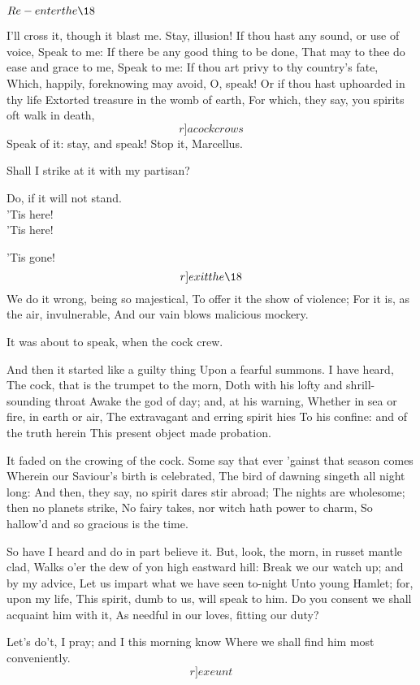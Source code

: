 \documentclass[11pt]{book}
\begin{document}
	\(Re-enter the \18\)

	I'll cross it, though it blast me. Stay, illusion!
	If thou hast any sound, or use of voice,
	Speak to me:
	If there be any good thing to be done,
	That may to thee do ease and grace to me,
	Speak to me:
	If thou art privy to thy country's fate,
	Which, happily, foreknowing may avoid,
   O, speak!
	Or if thou hast uphoarded in thy life
	Extorted treasure in the womb of earth,
	For which, they say, you spirits oft walk in death,
	\[r]a cock crows\]
	Speak of it: stay, and speak! Stop it, Marcellus.

	Shall I strike at it with my partisan?

\6	Do, if it will not stand. \\

	'Tis here! \\

\6	'Tis here!

	'Tis gone! 	\[r]exit the \18\]
	We do it wrong, being so majestical,
	To offer it the show of violence;
	For it is, as the air, invulnerable,
	And our vain blows malicious mockery.

	It was about to speak, when the cock crew.

\6	And then it started like a guilty thing
	Upon a fearful summons. I have heard,
	The cock, that is the trumpet to the morn,
	Doth with his lofty and shrill-sounding throat
	Awake the god of day; and, at his warning,
	Whether in sea or fire, in earth or air,
	The extravagant and erring spirit hies
	To his confine: and of the truth herein
	This present object made probation.

	It faded on the crowing of the cock.
	Some say that ever 'gainst that season comes
	Wherein our Saviour's birth is celebrated,
	The bird of dawning singeth all night long:
	And then, they say, no spirit dares stir abroad;
	The nights are wholesome; then no planets strike,
	No fairy takes, nor witch hath power to charm,
	So hallow'd and so gracious is the time.

\6	So have I heard and do in part believe it.
	But, look, the morn, in russet mantle clad,
	Walks o'er the dew of yon high eastward hill:
	Break we our watch up; and by my advice,
	Let us impart what we have seen to-night
	Unto young Hamlet; for, upon my life,
	This spirit, dumb to us, will speak to him.
	Do you consent we shall acquaint him with it,
	As needful in our loves, fitting our duty?

	Let's do't, I pray; and I this morning know
	Where we shall find him most conveniently. \[r]exeunt\]
\end{document}
